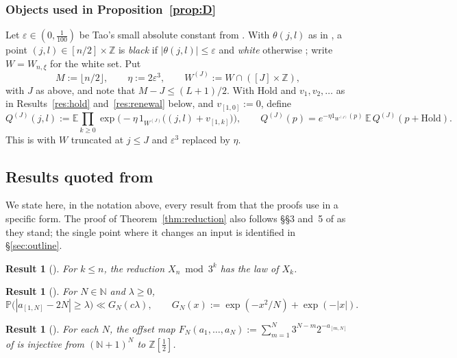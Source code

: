\documentclass[11pt]{amsart}
\newtheorem{tresult}[lemma]{Result}   %
\theoremstyle{remark}
\newcommand{\E}{\mathbb{E}}
\renewcommand{\P}{\mathbb{P}}
\newcommand{\Z}{\mathbb{Z}}
\newcommand{\Hold}{\mathrm{Hold}}
\newcommand{\T}[1]{\cite[#1]{Tao22}}   %
\newcommand{\Tc}{\cite{Tao22}}         %
\theoremstyle{plain}
\begin{document}
\subsubsection*{Objects used in Proposition~\ref{prop:D}}
Let $\varepsilon\in(0,\tfrac1{100})$ be Tao's small absolute constant from \T{\S7}. With $\theta(j,l)$ as in \T{(7.8)}, a point $(j,l)\in[n/2]\times\Z$ is \emph{black} if $|\theta(j,l)|\le\varepsilon$ and \emph{white} otherwise \T{(7.9)}; write $W=W_{n,\xi}$ for the white set. Put
\[
M:=\lfloor n/2\rfloor,\qquad \eta:=2\varepsilon^3,\qquad W^{(J)}:=W\cap([J]\times\Z),
\]
with $J$ as above, and note that $M-J\le(L+1)/2$. With $\Hold$ and $v_1,v_2,\dots$ as in Results~\ref{res:hold} and~\ref{res:renewal} below, and $v_{[1,0]}:=0$, define
\begin{equation}\label{eq:QJ}
Q^{(J)}(j,l):=\E\prod_{k\ge0}\exp\big(-\eta\,1_{W^{(J)}}\big((j,l)+v_{[1,k]}\big)\big),
\qquad
Q^{(J)}(p)=e^{-\eta 1_{W^{(J)}}(p)}\,\E\,Q^{(J)}(p+\Hold).
\end{equation}
This is \T{(7.34)--(7.35)} with $W$ truncated at $j\le J$ and $\varepsilon^3$ replaced by $\eta$.

\subsection{Results quoted from \Tc}
We state here, in the notation above, every result from \Tc{} that the proofs use in a specific form. The proof of Theorem~\ref{thm:reduction} also follows \S\S3 and~5 of \Tc{} as they stand; the single point where it changes an input is identified in \S\ref{sec:outline}.

\begin{tresult}[{\T{(1.23)}}]\label{res:reduce}
For $k\le n$, the reduction $X_n\bmod 3^k$ has the law of $X_k$.
\end{tresult}

\begin{tresult}[{\T{Lemma 2.2(ii)}}]\label{res:chernoff}
For $N\in\mathbb N$ and $\lambda\ge0$,
\[
\P\big(|a_{[1,N]}-2N|\ge\lambda\big)\ll G_N(c\lambda),\qquad G_N(x):=\exp(-x^2/N)+\exp(-|x|).
\]
\end{tresult}

\begin{tresult}[{\T{Lemma 6.2}}]\label{res:inject}
For each $N$, the offset map $F_N(a_1,\dots,a_N):=\sum_{m=1}^{N}3^{N-m}2^{-a_{[m,N]}}$ of \T{(1.5)} is injective from $(\mathbb N+1)^N$ to $\Z[\tfrac12]$.
\end{tresult}
\end{document}
